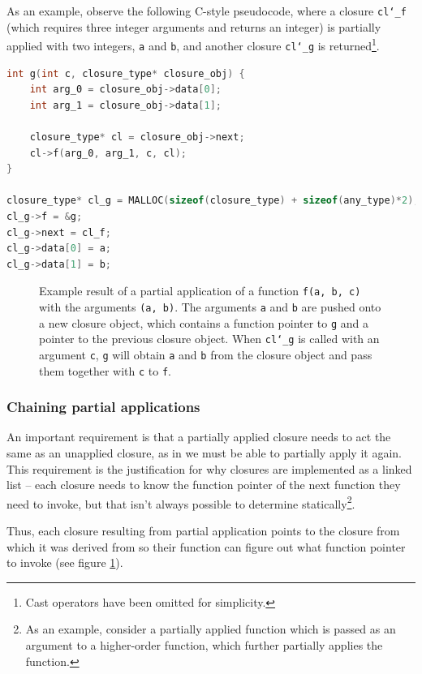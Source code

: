 \documentclass[12pt,a4paper,twoside,openright]{report}
\begin{document}
As an example, observe the following C-style pseudocode, where a closure
\texttt{cl\char`_f} (which requires three integer arguments and returns an
integer) is partially applied with two integers, \texttt{a} and \texttt{b}, and
another closure \texttt{cl\char`_g} is returned\footnote{Cast operators have
been omitted for simplicity.}.

\begin{lstlisting}[language=C]
int g(int c, closure_type* closure_obj) {
    int arg_0 = closure_obj->data[0];
    int arg_1 = closure_obj->data[1];
    
    closure_type* cl = closure_obj->next;
    cl->f(arg_0, arg_1, c, cl);
}

closure_type* cl_g = MALLOC(sizeof(closure_type) + sizeof(any_type)*2);
cl_g->f = &g;
cl_g->next = cl_f;
cl_g->data[0] = a;
cl_g->data[1] = b;
\end{lstlisting}

\begin{figure}
    \centering
    
    \caption{Example result of a partial application of a function \texttt{f(a, 
    b, c)} with the arguments \texttt{(a, b)}. The arguments \texttt{a} and 
    \texttt{b} are pushed onto a new closure object, which contains a function 
    pointer to \texttt{g} and a pointer to the previous closure object. When 
    \texttt{cl\char`_g} is called with an argument \texttt{c}, \texttt{g} will 
    obtain \texttt{a} and \texttt{b} from the closure object and pass them 
    together with \texttt{c} to \texttt{f}.}
    \label{fig:partial-app}
\end{figure}

\subsubsection{Chaining partial applications}

An important requirement is that a partially applied closure needs to act the
same as an unapplied closure, as in we must be able to partially apply it again.
This requirement is the justification for why closures are implemented as 
a linked list -- each closure needs to know the function pointer of the next 
function they need to invoke, but that isn't always possible to determine 
statically\footnote{As an example, consider a partially applied function which 
is passed as an argument to a higher-order function, which further partially 
applies the function.}.

Thus, each closure resulting from partial application points to the closure from
which it was derived from so their function can figure out what function pointer
to invoke (see figure \ref{fig:partial-app}).
\end{document}
